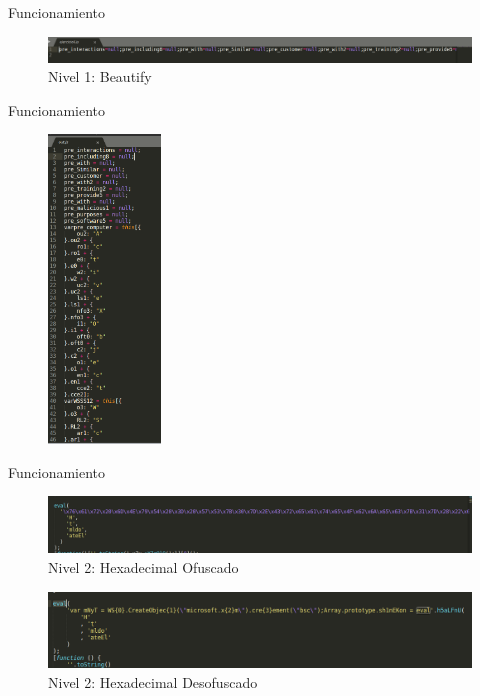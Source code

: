 \documentclass[aspectratio=169]{beamer}
\begin{document}
  	\begin{frame}{Funcionamiento}
		\begin{figure}[H]
			\centering
			\includegraphics[width=12cm]{images/level1.png}
			\caption{Nivel 1: Beautify} 
		\end{figure}
  	\end{frame}
  	\begin{frame}{Funcionamiento}
		\begin{figure}[H]
			\centering
			\includegraphics[width=3cm]{images/level1_after.png}
		\end{figure}
  	\end{frame}
  	\begin{frame}{Funcionamiento}
		\begin{figure}[H]
			\centering
			\includegraphics[width=12cm]{images/level2.png}
			\caption{Nivel 2: Hexadecimal Ofuscado} 
		\end{figure}
		
		\begin{figure}[H]
			\centering
			\includegraphics[width=12cm]{images/level2_after.png}
			\caption{Nivel 2: Hexadecimal Desofuscado} 
		\end{figure}
  	\end{frame}
  	
\end{document}
